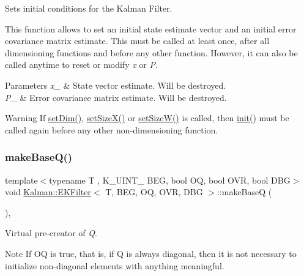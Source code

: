Sets initial conditions for the Kalman Filter. 

This function allows to set an initial state estimate vector and an initial error covariance matrix estimate. This must be called at least once, after all dimensioning functions and before any other function. However, it can also be called anytime to reset or modify {\itshape x} or {\itshape P}. 
\begin{DoxyParams}{Parameters}
{\em x\+\_\+} & State vector estimate. Will be destroyed. \\
\hline
{\em P\+\_\+} & Error covariance matrix estimate. Will be destroyed. \\
\hline
\end{DoxyParams}
\begin{DoxyWarning}{Warning}
If {\ttfamily \mbox{\hyperlink{classKalman_1_1EKFilter_a0c311fd7fc6d57c206029ea0e902cf2e}{set\+Dim()}}}, {\ttfamily \mbox{\hyperlink{classKalman_1_1EKFilter_a9c56983458ab0d3dca1a855baee71280}{set\+Size\+X()}}} or {\ttfamily \mbox{\hyperlink{classKalman_1_1EKFilter_a6518bb07784ffd30edc70750ec0459f1}{set\+Size\+W()}}} is called, then \mbox{\hyperlink{classKalman_1_1EKFilter_a80d5dc8f46e8f5d4ec3a6b1e804fdc9f}{init()}} must be called again before any other non-\/dimensioning function. 
\end{DoxyWarning}
\mbox{\label{classKalman_1_1EKFilter_af996b71b5762e8284226a96c6aac8d87}} 
\subsubsection{\texorpdfstring{make\+Base\+Q()}{makeBaseQ()}}
{\footnotesize\ttfamily template$<$typename T , K\+\_\+\+U\+I\+N\+T\+\_ B\+EG, bool OQ, bool O\+VR, bool D\+BG$>$ \\
void \mbox{\hyperlink{classKalman_1_1EKFilter}{Kalman\+::\+E\+K\+Filter}}$<$ T, B\+EG, OQ, O\+VR, D\+BG $>$\+::make\+BaseQ (\begin{DoxyParamCaption}{ }\end{DoxyParamCaption})\hspace{0.3cm}{\ttfamily [protected]}, {\ttfamily [virtual]}}



Virtual pre-\/creator of {\itshape Q}. 

\begin{DoxyNote}{Note}
If {\ttfamily OQ} is {\ttfamily true}, that is, if {\ttfamily Q} is always diagonal, then it is not necessary to initialize non-\/diagonal elements with anything meaningful. 
\end{DoxyNote}
\mbox{\label{classKalman_1_1EKFilter_adaa2b05e931d64bf8f762812e06ce369}} 
